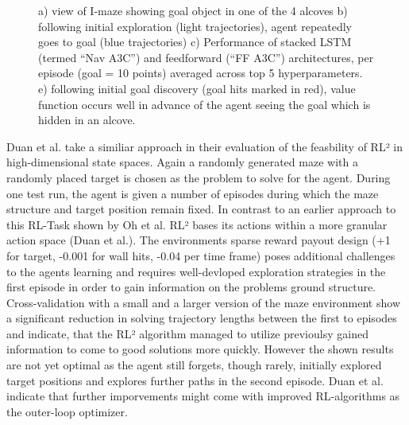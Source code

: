\documentclass[letterpaper, 10 pt, conference]{ieeeconf}  %
\begin{document}
\begin{figure}[thpb]
        \centering
  \caption{a) view of I-maze showing goal object in one of the 4 alcoves b) following initial exploration
  (light trajectories), agent repeatedly goes to goal (blue trajectories) c) Performance of stacked LSTM (termed
  “Nav A3C”) and feedforward (“FF A3C”) architectures, per episode (goal = 10 points) averaged across top 5
  hyperparameters. e) following initial goal discovery (goal hits marked in red), value function occurs well in
  advance of the agent seeing the goal which is hidden in an alcove.
  }
        \label{figurelabel}
     \end{figure}

Duan et al. take a similiar approach in their evaluation of the feasbility of RL² in high-dimensional state spaces. Again a randomly generated 
maze with a randomly placed target is chosen as the problem to solve for the agent. During one test run, the agent is given a number 
of episodes during which the maze structure and target position remain fixed. In contrast to an earlier approach to this RL-Task shown by Oh et al. 
RL² bases its actions within a more granular action space (Duan et al.). The environments sparse reward payout design (+1 for target, 
-0.001 for wall hits, -0.04 per time frame) poses additional challenges to the agents learning and requires well-devloped exploration strategies 
in the first episode in order to gain information on the problems ground structure. Cross-validation with a small and a larger version of the 
maze environment show a significant reduction in solving trajectory lengths between the first to episodes and indicate, that the RL² algorithm 
managed to utilize previoulsy gained information to come to good solutions more quickly. However the shown results are not yet optimal
as the agent still forgets, though rarely, initially explored target positions and explores further paths in the second episode. Duan et al. 
indicate that further imporvements might come with improved RL-algorithms as the outer-loop optimizer.
\end{document}
